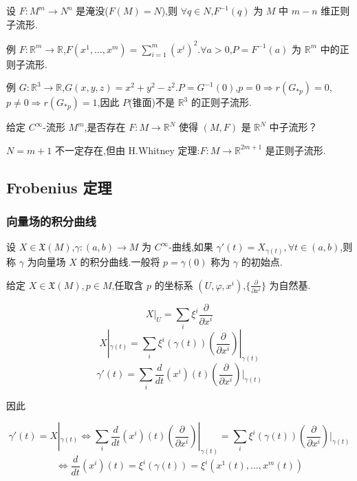 \begin{corollary}
设 $F : M^m \to N^n$ 是淹没($F(M) = N$),则 $\forall q \in N$,$F^{-1}(q)$ 为 $M$ 中 $m - n$ 维正则子流形.
\end{corollary}

例 $F: \mathbb{R}^m \rightarrow \mathbb{R}$,$F(x^1, \ldots, x^m) = \sum_{i=1}^m (x^i)^2$.$\forall a > 0$,$P = F^{-1}(a)$ 为 $\mathbb{R}^m$ 中的正则子流形.

例 $G: \mathbb{R}^3 \rightarrow \mathbb{R}$,$G(x,y,z) = x^2 + y^2 - z^2$.$P = G^{-1}(0)$,$p = 0 \Rightarrow r(G_{*p}) = 0$,$p \neq 0 \Rightarrow r(G_{*p}) = 1$,因此 $P$(锥面)不是 $\mathbb{R}^3$ 的正则子流形.

给定 $C^\infty$-流形 $M^m$,是否存在 $F: M \rightarrow \mathbb{R}^N$ 使得 $(M,F)$ 是 $\mathbb{R}^N$ 中子流形？

$N = m + 1$ 不一定存在,但由 H.Whitney 定理:$F: M \rightarrow \mathbb{R}^{2m+1}$ 是正则子流形.

\subsection{Frobenius 定理}

\subsubsection{向量场的积分曲线}

\begin{definition}
设 $X \in \mathfrak{X}(M)$,$\gamma : (a,b) \rightarrow M$ 为 $C^\infty$-曲线,如果 $\gamma'(t) = X_{\gamma(t)}, \forall t \in (a,b)$,则称 $\gamma$ 为向量场 $X$ 的积分曲线.一般将 $p = \gamma(0)$ 称为 $\gamma$ 的初始点.
\end{definition}

给定 $X \in \mathfrak{X}(M), p \in M$,任取含 $p$ 的坐标系 $(U, \varphi, x^i)$,$\{\frac{\partial}{\partial x^i}\}$ 为自然基.

\[
X|_U = \sum_i \xi^i \frac{\partial}{\partial x^i}
\]
\[
X|_{\gamma(t)} = \sum_i \xi^i (\gamma(t)) (\frac{\partial}{\partial x^i})|_{\gamma(t)}
\]
\[
\gamma'(t) = \sum_i \frac{d}{dt} (x^i)(t) (\frac{\partial}{\partial x^i})|_{\gamma(t)}
\]

因此

\[
\gamma'(t) = X|_{\gamma(t)} \iff \sum_i \frac{d}{dt} (x^i)(t) (\frac{\partial}{\partial x^i})|_{\gamma(t)} = \sum_i \xi^i (\gamma(t)) (\frac{\partial}{\partial x^i})|_{\gamma(t)}
\]
\[
\iff \frac{d}{dt} (x^i)(t) = \xi^i (\gamma(t)) = \xi^i (x^1(t), \ldots, x^m(t))
\]

